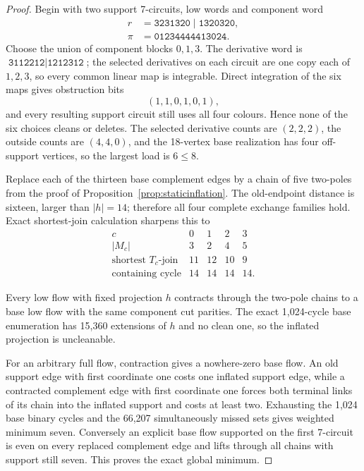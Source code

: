 \documentclass[11pt]{article}
\theoremstyle{definition}
\theoremstyle{remark}
\begin{document}
\begin{proof}
Begin with two support 7-circuits, low words and component word
\[
\begin{split}
r&=\texttt{3231320}\mid\texttt{1320320},\\
\pi&=\texttt{01234444413024}.
\end{split}
\]
Choose the union of component blocks \(0,1,3\).  The derivative word is
\(\texttt{3112212}\mid\texttt{1212312}\); the selected derivatives on
each circuit are one copy each of \(1,2,3\), so every common linear map
is integrable.  Direct integration of the six maps gives obstruction
bits
\[
                         (1,1,0,1,0,1),
\]
and every resulting support circuit still uses all four colours.  Hence
none of the six choices cleans or deletes.  The selected derivative
counts are \((2,2,2)\), the outside counts are \((4,4,0)\), and the
18-vertex base realization has four off-support vertices, so the largest
load is \(6\le8\).

Replace each of the thirteen base complement edges by a chain of five
two-poles from the proof of Proposition~\ref{prop:staticinflation}.  The
old-endpoint distance is sixteen, larger than \(|h|=14\); therefore all
four complete exchange families hold.  Exact shortest-join calculation
sharpens this to
\[
\begin{array}{c|rrrr}
c&0&1&2&3\\ \hline
|M_c|&3&2&4&5\\
\text{shortest \(T_c\)-join}&11&12&10&9\\
\text{containing cycle}&14&14&14&14 .
\end{array}
\]

Every low flow with fixed projection \(h\) contracts through the
two-pole chains to a base low flow with the same component cut parities.
The exact 1,024-cycle base enumeration has 15,360 extensions of \(h\)
and no clean one, so the inflated projection is uncleanable.

For an arbitrary full flow, contraction gives a nowhere-zero base flow.
An old support edge with first coordinate one costs one inflated support
edge, while a contracted complement edge with first coordinate one
forces both terminal links of its chain into the inflated support and
costs at least two.  Exhausting the 1,024 base binary cycles and the
66,207 simultaneously missed sets gives weighted minimum seven.
Conversely an explicit base flow supported on the first 7-circuit is
even on every replaced complement edge and lifts through all chains with
support still seven.  This proves the exact global minimum.
\end{proof}
\end{document}
